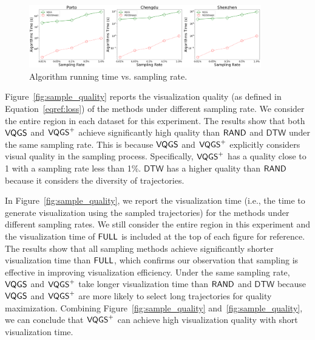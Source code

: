 \begin{figure}[t]
	\centering
	\includegraphics[width=0.9\textwidth]{pictures/quantitative_study_icde/rate_algtime.png}
	\caption{Algorithm running time vs. sampling rate.}
	\label{fig:rate_algtime}
\end{figure}


 Figure~\ref{fig:sample_quality} reports the visualization quality (as defined in Equation~\eqref{eqref:loss}) of the methods under different sampling rate. We consider the entire region in each dataset for this experiment. The results show that both $\mathsf{VQGS}$ and $\mathsf{VQGS}^{+}$ achieve significantly high quality than $\mathsf{RAND}$ and $\mathsf{DTW}$ under the same sampling rate. This is because $\mathsf{VQGS}$ and $\mathsf{VQGS}^{+}$ explicitly considers visual quality in the sampling process. Specifically, $\mathsf{VQGS}^{+}$ has a quality close to 1 with a sampling rate less than 1\%. $\mathsf{DTW}$ has a higher quality than $\mathsf{RAND}$ because it considers the diversity of trajectories. 

In Figure~\ref{fig:sample_quality}, we report the visualization time (i.e., the time to generate visualization using the sampled trajectories) for the methods under different sampling rates. We still consider the entire region in this experiment and the visualization time of $\mathsf{FULL}$ is included at the top of each figure for reference. The results show that all sampling methods achieve significantly shorter visualization time than $\mathsf{FULL}$, which confirms our observation that sampling is effective in improving visualization efficiency. Under the same sampling rate, $\mathsf{VQGS}$ and $\mathsf{VQGS}^{+}$ take longer visualization time than $\mathsf{RAND}$ and $\mathsf{DTW}$ because $\mathsf{VQGS}$ and $\mathsf{VQGS}^{+}$ are more likely to select long trajectories for quality maximization. Combining Figure~\ref{fig:sample_quality} and~\ref{fig:sample_quality}, we can conclude that $\mathsf{VQGS}^{+}$ can achieve high visualization quality with  short visualization time.   

